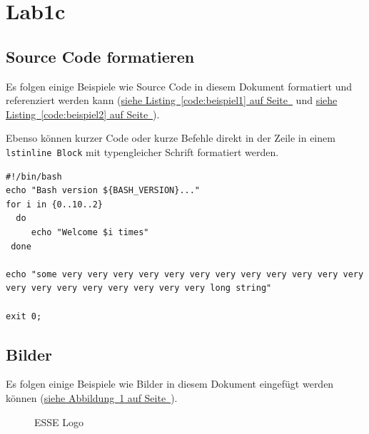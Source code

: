 \documentclass[12pt,a4paper,titlepage,oneside]{scrartcl}
\begin{document}
\section{Lab1c}

\subsection{Source Code formatieren}
Es folgen einige Beispiele wie Source Code in diesem Dokument formatiert und referenziert werden kann
(\hyperref[code:beispiel1]{siehe Listing~\ref*{code:beispiel1} auf Seite~\pageref*{code:beispiel1}} und \hyperref[code:beispiel2]{siehe Listing~\ref*{code:beispiel2} auf Seite~\pageref*{code:beispiel2}}).

Ebenso können kurzer Code oder kurze Befehle direkt in der Zeile in einem \lstinline{lstinline Block} mit typengleicher Schrift formatiert werden.



\begin{lstlisting}[caption=Example bash script,label=code:beispiel2,style=simple]
#!/bin/bash
echo "Bash version ${BASH_VERSION}..."
for i in {0..10..2}
  do
     echo "Welcome $i times"
 done

echo "some very very very very very very very very very very very very very very very very very very very very long string"

exit 0;
\end{lstlisting}

\subsection{Bilder}

Es folgen einige Beispiele wie Bilder in diesem Dokument eingefügt werden können
(\hyperref[fig:logo1]{siehe Abbildung~\ref*{fig:logo1} auf Seite~\pageref*{fig:logo1}}).

\begin{figure}[h!]
  \centering
  \caption{ESSE Logo}
  \label{fig:logo1}
\end{figure}


%
%
\end{document}
